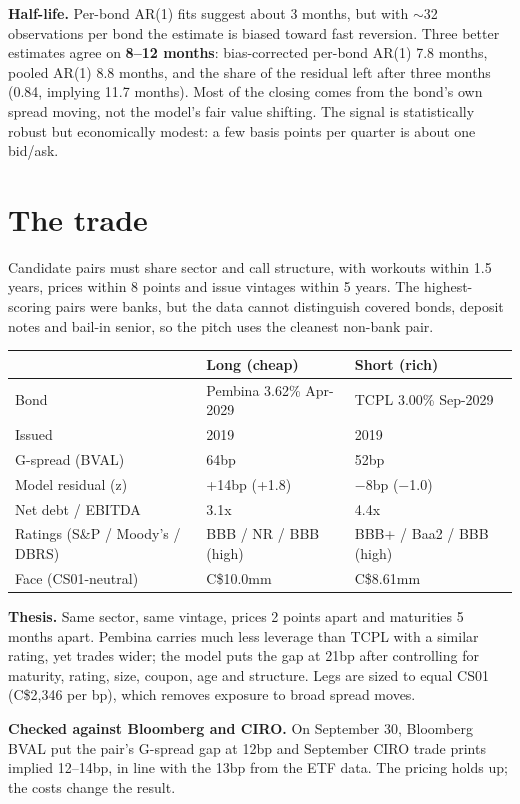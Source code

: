 \documentclass[11pt,letterpaper]{article}
\begin{document}
\textbf{Half-life.} Per-bond AR(1) fits suggest about 3 months, but with $\sim$32 observations per bond the estimate is biased toward fast reversion. Three better estimates agree on \textbf{8--12 months}: bias-corrected per-bond AR(1) 7.8 months, pooled AR(1) 8.8 months, and the share of the residual left after three months (0.84, implying 11.7 months). Most of the closing comes from the bond's own spread moving, not the model's fair value shifting. The signal is statistically robust but economically modest: a few basis points per quarter is about one bid/ask.

\section{The trade}
Candidate pairs must share sector and call structure, with workouts within 1.5 years, prices within 8 points and issue vintages within 5 years. The highest-scoring pairs were banks, but the data cannot distinguish covered bonds, deposit notes and bail-in senior, so the pitch uses the cleanest non-bank pair.

\begin{table}[h]\centering\small
\begin{tabular}{@{}lll@{}}\toprule
 & Long (cheap) & Short (rich) \\ \midrule
Bond & Pembina 3.62\% Apr-2029 & TCPL 3.00\% Sep-2029 \\
Issued & 2019 & 2019 \\
G-spread (BVAL) & 64bp & 52bp \\
Model residual (z) & +14bp (+1.8) & $-$8bp ($-$1.0) \\
Net debt / EBITDA & 3.1x & 4.4x \\
Ratings (S\&P / Moody's / DBRS) & BBB / NR / BBB (high) & BBB+ / Baa2 / BBB (high) \\
Face (CS01-neutral) & C\$10.0mm & C\$8.61mm \\ \bottomrule
\end{tabular}
\end{table}

\textbf{Thesis.} Same sector, same vintage, prices 2 points apart and maturities 5 months apart. Pembina carries much less leverage than TCPL with a similar rating, yet trades wider; the model puts the gap at 21bp after controlling for maturity, rating, size, coupon, age and structure. Legs are sized to equal CS01 (C\$2,346 per bp), which removes exposure to broad spread moves.

\textbf{Checked against Bloomberg and CIRO.} On September 30, Bloomberg BVAL put the pair's G-spread gap at 12bp and September CIRO trade prints implied 12--14bp, in line with the 13bp from the ETF data. The pricing holds up; the costs change the result.
\end{document}
